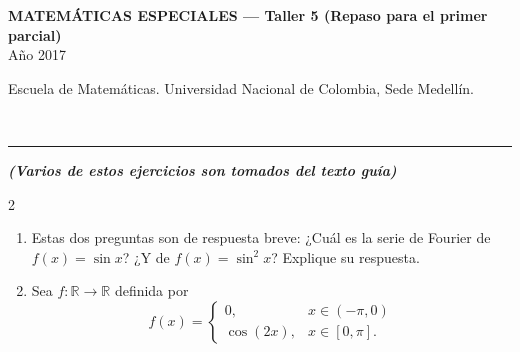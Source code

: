 \documentclass[11pt]{article}
\newcommand{\examheader}[2]{%
  \noindent
  \begin{minipage}[t]{0.6\linewidth}
    {\small\bfseries MATEM\'ATICAS ESPECIALES --- #1}\\
    {\small #2}
  \end{minipage}%
  \hfill
  \begin{minipage}[t]{0.35\linewidth}
    \raggedleft\small Escuela de Matem\'aticas. Universidad Nacional de Colombia, Sede Medell\'in.
  \end{minipage}\\[2pt]
  \rule{\linewidth}{0.6pt}
}
\begin{document}
\examheader{Taller 5 (Repaso para el primer parcial)}{A\~no 2017}

{\small\itshape\bfseries (Varios de estos ejercicios son tomados del texto guía)}

\columnseprule=0.5pt
\begin{multicols}{2}
\begin{enumerate}
\item Estas dos preguntas son de respuesta breve: ¿Cuál es la serie de Fourier de $f(x) = \sin x$? ¿Y de $f(x) = \sin^2 x$? Explique su respuesta.

\item Sea $f:\mathbb{R}\to\mathbb{R}$ definida por
\[
f(x) = \begin{cases} 0, & x \in (-\pi,0) \\ \cos(2x), & x \in [0,\pi]. \end{cases}
\]
\end{enumerate}
\end{multicols}
\end{document}
